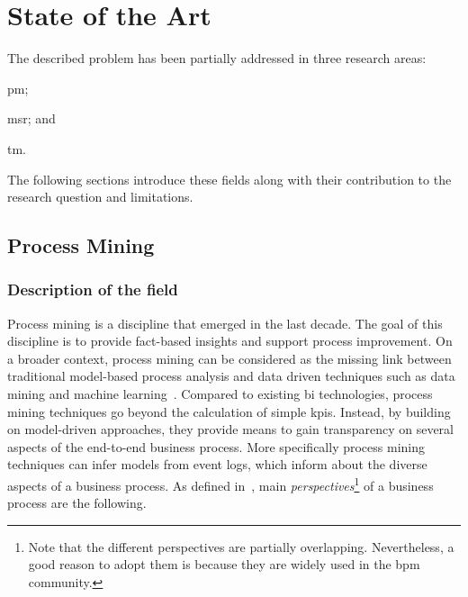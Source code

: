 \documentclass[a4paper,11pt]{article}
\begin{document}
\section{State of the Art}
\label{sec:state-of-field}
The described problem has been partially addressed in three research areas:
\begin{inparaenum}[\itshape i)]
	\item \gls{pm};
	\item \gls{msr}; and
	\item \gls{tm}.
\end{inparaenum}
The following sections introduce these fields along with their contribution to the research question and limitations. 

\subsection{Process Mining}
\label{sec:process-mining}

\subsubsection{Description of the field}

Process mining is a discipline that emerged in the last decade. The goal of this discipline is to provide fact-based insights and support process improvement. On a broader context, process mining can be considered as the missing link between traditional model-based process analysis and data driven techniques such as data mining and machine learning~\cite{VanderAalst2016b}. Compared to existing \gls{bi} technologies, process mining techniques go beyond the calculation of simple \glspl{kpi}. Instead, by building on model-driven approaches, they provide means to gain transparency on several aspects of the end-to-end business process. More specifically process mining techniques can infer models from event logs, which inform about the diverse aspects of a business process.
As defined in~\cite{VanderAalst2016b}, main \emph{perspectives}\footnote{Note that the different perspectives are partially overlapping. Nevertheless, a good reason to adopt them is because they are widely used in the \gls{bpm} community.} of a business process are the following. 
\end{document}
